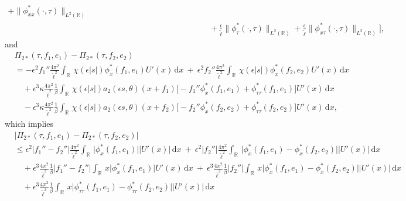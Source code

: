 \documentclass[10pt, reqno]{amsart}
\numberwithin{equation}{section}
\theoremstyle{definition}
\begin{document}
{\begin{align*}
+ \|\phi^*_{xx}(\cdot, \tau)\|_{L^2({\mathbb R})}
\nonumber\\[2mm]
& \qquad\qquad \qquad\qquad \qquad\qquad \qquad
+ \frac{\epsilon}{\tilde\ell}\|\phi^*_\tau(\cdot, \tau)\|_{L^2({\mathbb R})}+ \frac{\epsilon}{\tilde\ell}\|\phi^*_{x\tau}(\cdot, \tau)\|_{L^2({\mathbb R})} \Bigg],
\end{align*}
and
\begin{align} \label{minus of Pi2star}
&\Pi_{2*} (\tau, f_1, e_1) - \Pi_{2*} (\tau, f_2, e_2)
\nonumber\\[2mm]
& =
 - \epsilon^2 f_1''\frac{4\pi^2}{{\tilde\ell}^2}\int_{\mathbb R}\,\chi(\epsilon|s|) \phi^*_x(f_1, e_1) U'(x)\,{\mathrm d}x
\ +\
\epsilon^2 f_2''\frac{4\pi^2}{{\tilde\ell}^2}\int_{\mathbb R}\, \chi(\epsilon|s|) \phi^*_x(f_2, e_2) U'(x)\,{\mathrm d}x
\nonumber\\[2mm]
&\quad + \epsilon^3 \kappa  \frac{4\pi^2}{{\tilde\ell}^2}\frac{1}{\beta} \int_{\mathbb R}\, \chi(\epsilon|s|) a_2(\epsilon s, \theta)(x+f_1)\Big[ -f_1''\phi^*_x(f_1, e_1) +\phi^*_{\tau\tau}(f_1, e_1) \Big] U'(x)\,{\mathrm d}x
\nonumber\\[2mm]
&\quad  -\epsilon^3 \kappa  \frac{4\pi^2}{{\tilde\ell}^2}\frac{1}{\beta} \int_{\mathbb R}\, \chi(\epsilon|s|) a_2(\epsilon s, \theta)(x+f_2)\Big[ -f_2''\phi^*_x(f_2, e_2)+\phi^*_{\tau\tau}(f_2, e_2) \Big] U'(x)\,{\mathrm d}x,
\end{align}
which implies
\begin{align}\label{minus of Pi2star1}
&\Big|\Pi_{2*} (\tau, f_1, e_1) - \Pi_{2*} (\tau, f_2, e_2)\Big|
\nonumber\\[2mm]
& \le \epsilon^2\big|f_1''-f_2''\big|\frac{4\pi^2}{{\tilde\ell}^2}
\int_{\mathbb R}\,  \big|\phi^*_x(f_1, e_1)\big| |U'(x)|\,{\mathrm d}x
\ +\
\epsilon^2|f_2''| \frac{4\pi^2}{{\tilde\ell}^2}
\int_{\mathbb R}\, \Big|\phi^*_x(f_1, e_1) - \phi^*_x(f_2, e_2)\Big| \big|U'(x)\big|\,{\mathrm d}x
\nonumber\\[2mm]
&\quad + \epsilon^3 \frac{4\pi^2}{{\tilde\ell}^2}\frac{1}{\beta}
\big|f_1''-f_2''\big|
\int_{\mathbb R}\, x\big|\phi^*_x(f_1, e_1)\big|U'(x)\,{\mathrm d}x
\ +\
\epsilon^3 \frac{4\pi^2}{{\tilde\ell}^2}\frac{1}{\beta}
\big|f_2''\big| \int_{\mathbb R}\, x\big|\phi^*_x(f_1, e_1)- \phi^*_x(f_2, e_2)\big||U'(x)|\,{\mathrm d}x
\nonumber\\[2mm]
&\quad + \epsilon^3 \frac{4\pi^2}{{\tilde\ell}^2}\frac{1}{\beta}
 \int_{\mathbb R}\, x\big|\phi^*_{\tau\tau}(f_1, e_1)- \phi^*_{\tau\tau}(f_2, e_2)\big| |U'(x)|\,{\mathrm d}x
\nonumber\\[2mm]

\end{align}}
\end{document}
